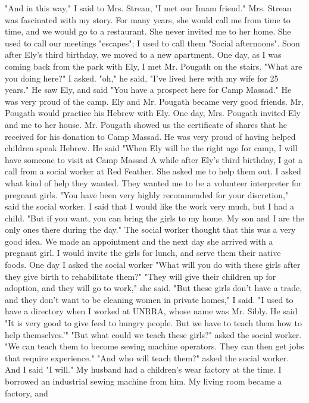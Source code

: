 "And in this way," I said to Mrs.
Strean, "I met our Imam friend."
Mrs.
Strean was fascinated with my story.
For many years, she would call 
me from time to time, and we would go to a restaurant.
She never invited me to her home.
She used to call our meetings "escapes"; I used to 
call them "Social afternoons".
Soon after Ely's third birthday, we moved to a new apartment.
One 
day, as I was coming back from the park with Ely, I met Mr.
Pougath on 
the stairs.
"What are you doing here?"
I asked.
"oh," he said, "I've lived here with my wife for 25 years."
He saw 
Ely, and said "You have a prospect here for Camp Massad."
He was very 
proud of the camp.
Ely and Mr.
Pougath became very good friends.
Mr, Pougath would practice his Hebrew with Ely.
One day, Mrs.
Pougath invited Ely and me to 
her house.
Mr.
Pougath showed us the certificate of shares that he received for his donation to Camp Massad.
He was very proud of having helped children speak Hebrew.
He said "When Ely will be the right age for 
camp, I will have someone to visit at Camp Massad 
A while after Ely's third birthday, I got a call from a social worker at Red Feather.
She asked me to help them out.
I asked what kind of 
help they wanted.
They wanted me to be a volunteer interpreter for pregnant girls.
"You have been very highly recommended for your discretion," said 
the social worker.
I said that I would like the work very much, but I had a child.
"But 
if you want, you can bring the girls to my home.
My son and I are the 
only ones there during the day."
The social worker thought that this was a very good idea.
We made an appointment and the next day she arrived with a pregnant girl.
I 
would invite the girls for lunch, and serve them their native foods.
One
day I asked the social worker "What will you do with these girls after 
they give birth to rehabilitate them?"
"They will give their children up for adoption, and they will go to 
work," she said.
"But these girls don't have a trade, and they don't want to be cleaning women in private homes," I said.
"I used to have a directory when I 
worked at UNRRA, whose name was Mr.
Sibly.
He said "It is very good to 
give feed to hungry people.
But we have to teach them how to help themselves.'"
"But what could we teach these girls?"
asked the social worker.
"We can teach them to become sewing machine operators.
They can then get jobs that require experience."
"And who will teach them?"
asked the social worker.
And I said "I will."
My husband had a children's wear factory at the time.
I borrowed an 
industrial sewing machine from him.
My living room became a factory, and 
